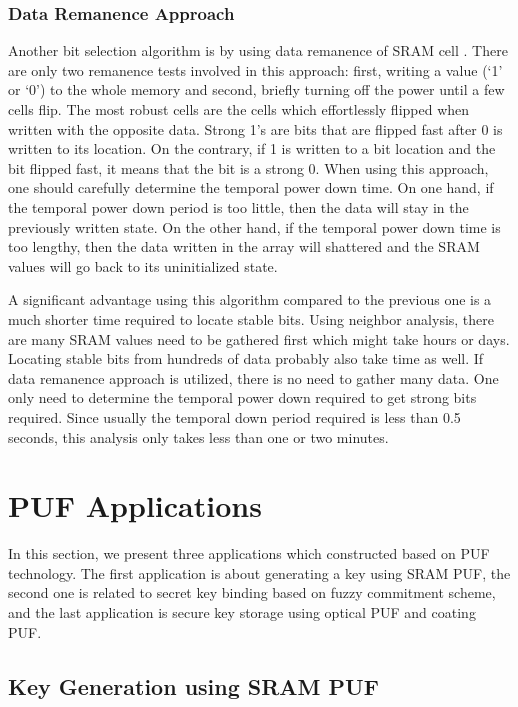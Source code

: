 \subsubsection{Data Remanence Approach}

Another bit selection algorithm is by using data remanence of SRAM cell \cite{liu_zhou_tang_parhi_kim_2017}.
There are only two remanence tests involved in this approach: first, writing a value (‘1’ or ‘0’) to the whole memory and second, briefly turning off the power until a few cells flip. The most robust cells are the cells which effortlessly flipped when written with the opposite data. Strong 1's are bits that are flipped fast after 0 is written to its location. On the contrary, if 1 is written to a bit location and the bit flipped fast, it means that the bit is a strong 0.
When using this approach, one should carefully determine the temporal power down time. On one hand, if the temporal power down period is too little, then the data will stay in the previously written state. On the other hand, if the temporal power down time is too lengthy, then the data written in the array will shattered and the SRAM values will go back to its uninitialized state.

A significant advantage using this algorithm compared to the previous one is a much shorter time required to locate stable bits. Using neighbor analysis, there are many SRAM values need to be gathered first which might take hours or days. Locating stable bits from hundreds of data probably also take time as well. If data remanence approach is utilized, there is no need to gather many data. One only need to determine the temporal power down required to get strong bits required. Since usually the temporal down period required is less than 0.5 seconds, this analysis only takes less than one or two minutes.

\section{PUF Applications}
In this section, we present three applications which constructed based on PUF technology. The first application is about generating a key using SRAM PUF, the second one is related to secret key binding based on fuzzy commitment scheme, and the last application is secure key storage using optical PUF and coating PUF.

\subsection{Key Generation using SRAM PUF}

